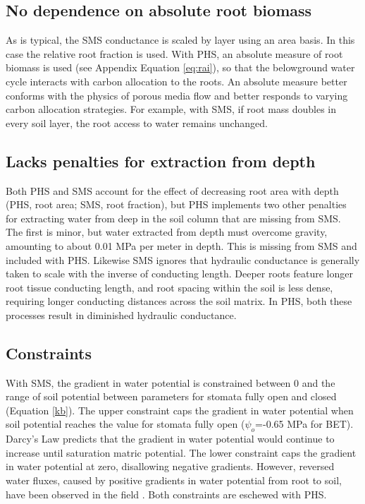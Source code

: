 \documentclass[draft,linenumbers]{agujournal}
\begin{document}
    \subsection{No dependence on absolute root biomass}
    As is typical, the SMS conductance is scaled by layer using an area basis.
    In this case the relative root fraction is used.
    With PHS, an absolute measure of root biomass is used (see Appendix Equation \ref{eq:rai}), so that the belowground water cycle interacts with carbon allocation to the roots.
    An absolute measure better conforms with the physics of porous media flow and better responds to varying carbon allocation strategies.
    For example, with SMS, if root mass doubles in every soil layer, the root access to water remains unchanged.

    \subsection{Lacks penalties for extraction from depth}
    Both PHS and SMS account for the effect of decreasing root area with depth (PHS, root area; SMS, root fraction), but
    PHS implements two other penalties for extracting water from deep in the soil column that are missing from SMS.
    The first is minor, but water extracted from depth must overcome gravity, amounting to about 0.01 MPa per meter in depth. 
    This is missing from SMS and included with PHS. 
    Likewise SMS ignores that hydraulic conductance is generally taken to scale with the inverse of conducting length.
    Deeper roots feature longer root tissue conducting length, and root spacing within the soil is less dense, requiring longer conducting distances across the soil matrix.
    In PHS, both these processes result in diminished hydraulic conductance.

    \subsection{Constraints}
    With SMS, the gradient in water potential is constrained between 0 and 
    the range of soil potential between parameters for stomata fully open and closed (Equation \ref{kb}). 
    The upper constraint caps the gradient in water potential when soil potential reaches the value for stomata fully open ($\psi_o$=-0.65 MPa for BET).
    Darcy's Law predicts that the gradient in water potential would continue to increase until saturation matric potential.
    The lower constraint caps the gradient in water potential at zero, disallowing negative gradients.
    However, reversed water fluxes, caused by positive gradients in water potential from root to soil, have been observed in the field \citep{burgess1998}.
    Both constraints are eschewed with PHS.     
\end{document}
